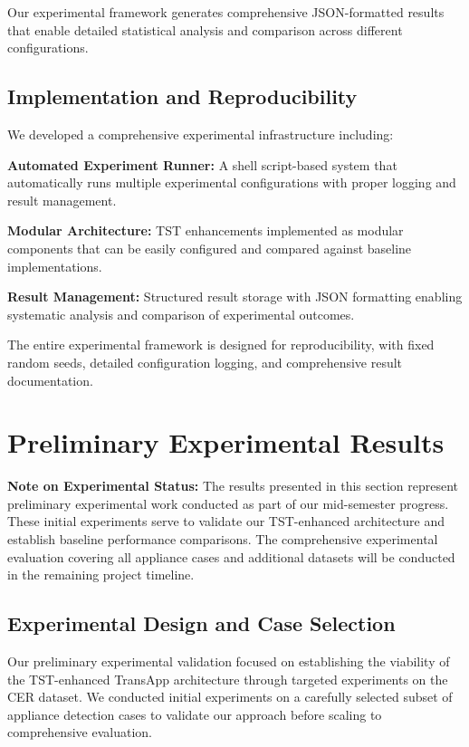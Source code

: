 \documentclass[conference]{IEEEtran}
\begin{document}
Our experimental framework generates comprehensive JSON-formatted results that enable detailed statistical analysis and comparison across different configurations.

\subsection{Implementation and Reproducibility}

We developed a comprehensive experimental infrastructure including:

\textbf{Automated Experiment Runner:} A shell script-based system that automatically runs multiple experimental configurations with proper logging and result management.

\textbf{Modular Architecture:} TST enhancements implemented as modular components that can be easily configured and compared against baseline implementations.

\textbf{Result Management:} Structured result storage with JSON formatting enabling systematic analysis and comparison of experimental outcomes.

The entire experimental framework is designed for reproducibility, with fixed random seeds, detailed configuration logging, and comprehensive result documentation.

\section{Preliminary Experimental Results}
\label{sec:results}

\textbf{Note on Experimental Status:} The results presented in this section represent preliminary experimental work conducted as part of our mid-semester progress. These initial experiments serve to validate our TST-enhanced architecture and establish baseline performance comparisons. The comprehensive experimental evaluation covering all appliance cases and additional datasets will be conducted in the remaining project timeline.

\subsection{Experimental Design and Case Selection}

Our preliminary experimental validation focused on establishing the viability of the TST-enhanced TransApp architecture through targeted experiments on the CER dataset. We conducted initial experiments on a carefully selected subset of appliance detection cases to validate our approach before scaling to comprehensive evaluation.
\end{document}
